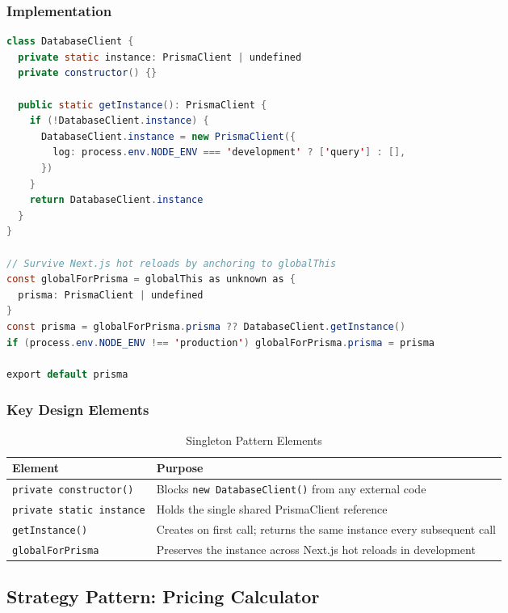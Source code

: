 \documentclass[12pt, a4paper]{article}
\begin{document}
\subsubsection{Implementation}

\begin{lstlisting}[language=Java, caption=Singleton Pattern in lib/prisma.ts (TypeScript)]
class DatabaseClient {
  private static instance: PrismaClient | undefined
  private constructor() {}

  public static getInstance(): PrismaClient {
    if (!DatabaseClient.instance) {
      DatabaseClient.instance = new PrismaClient({
        log: process.env.NODE_ENV === 'development' ? ['query'] : [],
      })
    }
    return DatabaseClient.instance
  }
}

// Survive Next.js hot reloads by anchoring to globalThis
const globalForPrisma = globalThis as unknown as {
  prisma: PrismaClient | undefined
}
const prisma = globalForPrisma.prisma ?? DatabaseClient.getInstance()
if (process.env.NODE_ENV !== 'production') globalForPrisma.prisma = prisma

export default prisma
\end{lstlisting}

\subsubsection{Key Design Elements}

\begin{table}[H]
\centering
\caption{Singleton Pattern Elements}
\begin{tabularx}{\textwidth}{lX}
\toprule
\textbf{Element} & \textbf{Purpose} \\
\midrule
\texttt{private constructor()} & Blocks \texttt{new DatabaseClient()} from any external code \\
\texttt{private static instance} & Holds the single shared PrismaClient reference \\
\texttt{getInstance()} & Creates on first call; returns the same instance every subsequent call \\
\texttt{globalForPrisma} & Preserves the instance across Next.js hot reloads in development \\
\bottomrule
\end{tabularx}
\end{table}

\subsection{Strategy Pattern: Pricing Calculator}
\end{document}
